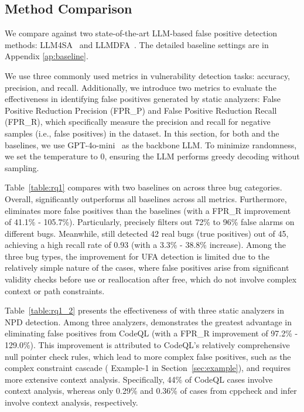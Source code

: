 \subsection{Method Comparison}

 We compare \app{} against two state-of-the-art LLM-based false positive detection methods: LLM4SA~\cite{llm4sa} and LLMDFA~\cite{llmdfa}. 
The detailed baseline settings are in Appendix \ref{ap:baseline}.

We use three commonly used metrics in vulnerability detection tasks: accuracy, precision, and recall. Additionally, we introduce two metrics to evaluate the effectiveness in identifying false positives generated by static analyzers: False Positive Reduction Precision (FPR\_P) and False Positive Reduction Recall (FPR\_R), which specifically measure the precision and recall for negative samples (i.e., false positives) in the dataset.
In this section, for both \app{} and the baselines, we use GPT-4o-mini~\cite{gpt4o} as the backbone LLM. To minimize randomness, we set the temperature to 0, ensuring the LLM performs greedy decoding without sampling.

Table~\ref{table:rq1} compares \app{} with two baselines on \ourbench{} across three bug categories. 
Overall, \app{} significantly outperforms all baselines across all metrics. Furthermore, \app{} eliminates more false positives than the baselines (with a FPR\_R improvement of 41.1\% - 105.7\%). Particularly, \app{} precisely filters out 72\% to 96\% false alarms on different bugs. Meanwhile, \app{} still detected 42 real bugs (true positives) out of 45, achieving a high recall rate of 0.93 (with a 3.3\% - 38.8\% increase). 
Among the three bug types, the improvement for UFA detection is limited due to the relatively simple nature of the cases, where false positives arise from significant validity checks before use or reallocation after free, which do not involve complex context or path constraints. 

Table~\ref{table:rq1_2} presents the effectiveness of \app{} with three static analyzers in NPD detection. 
Among three analyzers, \app{} demonstrates the greatest advantage in eliminating false positives from CodeQL (with a FPR\_R improvement of 97.2\% - 129.0\%). This improvement is attributed to CodeQL's relatively comprehensive null pointer check rules, which lead to more complex false positives, such as the complex constraint cascade (\eg{} Example-1 in Section~\ref{sec:example}), and requires more extensive context analysis. Specifically, 44\% of CodeQL cases involve context analysis, whereas only 0.29\% and 0.36\% of cases from cppcheck and infer involve context analysis, respectively.

